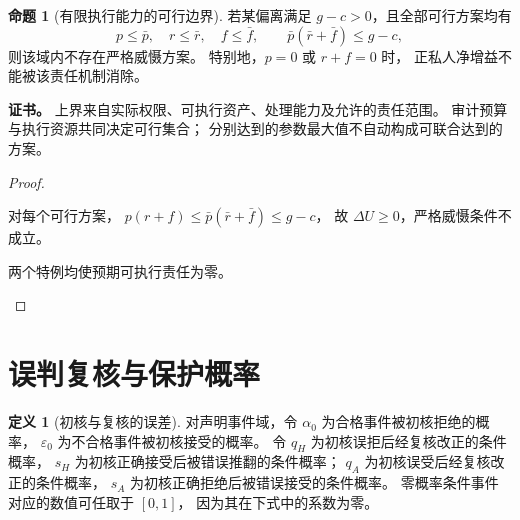 \documentclass[UTF8,12pt,a4paper,openany,fontset=none,zihao=false]{ctexrep}
\theoremstyle{definition}
\newtheorem{definition}{定义}[chapter]
\newtheorem{proposition}{命题}[chapter]
\newenvironment{certificate}{\par\noindent\textbf{证书。}\ignorespaces}{\par}
\newcommand{\1}{\mathbf 1}
\begin{document}
\begin{proposition}[有限执行能力的可行边界]
\label{inc:prop-enforcement-bound}
若某偏离满足 \(g-c>0\)，且全部可行方案均有
\[
 p\le\bar p,\quad r\le\bar r,\quad f\le\bar f,\qquad
 \bar p(\bar r+\bar f)\le g-c,
\]
则该域内不存在严格威慑方案。
特别地，\(p=0\) 或 \(r+f=0\) 时，
正私人净增益不能被该责任机制消除。
\end{proposition}
\begin{certificate}
上界来自实际权限、可执行资产、处理能力及允许的责任范围。
审计预算与执行资源共同决定可行集合；
分别达到的参数最大值不自动构成可联合达到的方案。
\end{certificate}
\begin{proof}
\begin{semanticsteps}
\item 对每个可行方案，
\(p(r+f)\le\bar p(\bar r+\bar f)\le g-c\)，
故 \(\Delta U\ge0\)，严格威慑条件不成立。
\item 两个特例均使预期可执行责任为零。
\end{semanticsteps}
\end{proof}

\section{误判复核与保护概率}

\begin{definition}[初核与复核的误差]
\label{inc:def-errors}
对声明事件域，令 \(\alpha_0\) 为合格事件被初核拒绝的概率，
\(\varepsilon_0\) 为不合格事件被初核接受的概率。
令 \(q_H\) 为初核误拒后经复核改正的条件概率，
\(s_H\) 为初核正确接受后被错误推翻的条件概率；
\(q_A\) 为初核误受后经复核改正的条件概率，
\(s_A\) 为初核正确拒绝后被错误接受的条件概率。
零概率条件事件对应的数值可任取于 \([0,1]\)，
因为其在下式中的系数为零。
\end{definition}
\end{document}
